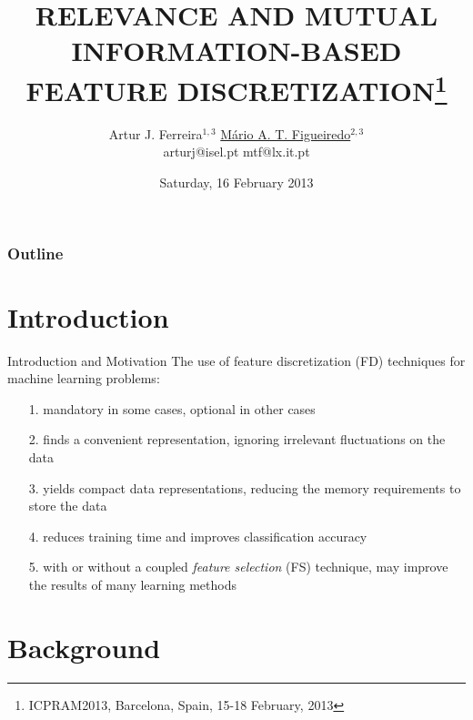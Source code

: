 \documentclass{beamer}
\title{\uppercase{RELEVANCE AND MUTUAL INFORMATION-BASED FEATURE DISCRETIZATION}\footnote{\footnotesize ICPRAM2013, Barcelona, Spain, 15-18 February, 2013}}
\author{
	{\large Artur J. Ferreira$^{1,3}$ \qquad \underline{M\'ario A. T. Figueiredo}$^{2,3}$} \\
	{\hspace{-1cm} arturj@isel.pt \hspace{2.45cm} mtf@lx.it.pt}
}
\institute
{
	\vspace{0.5cm} \\
	{\normalsize $^1$Instituto Superior de Engenharia de Lisboa } \\
	{\normalsize $^2$Instituto Superior T\'{e}cnico} \\
	{\normalsize $^3$Instituto de Telecomunica\c{c}\~{o}es,  Lisboa, PORTUGAL} \\	
}
\date{
	\vspace{-0.75cm}
	Saturday, 16 February 2013
}
\begin{document}
\begin{frame}[t,plain]
\titlepage
\end{frame}

\begin{frame}
\frametitle{Outline}
\tableofcontents
\end{frame}

\section[Introduction]{Introduction}
\begin{frame}{Introduction and Motivation}
The use of feature discretization (FD) techniques for machine learning problems:
\begin{itemize}%
	\vfill
	\item[1.] mandatory in some cases, optional in other cases

	\vfill
	\item[2.] finds a convenient representation, ignoring irrelevant
	fluctuations on the data

	\vfill
	\item[3.] yields compact data representations, reducing 
	the memory requirements to store the data

	\vfill
	\item[4.] reduces training time and improves classification accuracy
	
	\vfill
	\item[5.] with or without a coupled \emph{feature selection} (FS) 
	technique, may improve the results of many learning methods
\end{itemize}
\end{frame}


\section[Background]{Background}
\end{document}
